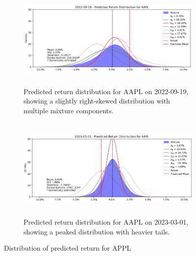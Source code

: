 \begin{figure}[H]
    \centering
    \begin{subfigure}[b]{0.49\textwidth}
        \centering
        \includegraphics[width=\linewidth, height=5cm]{Images/Results/APPL_distribution_example_1.png}
        \caption{Predicted return distribution for AAPL on 2022-09-19, showing a slightly right-skewed distribution with multiple mixture components.}
        \label{fig:APPL_distribution_example_1}
    \end{subfigure}
    \hfill
    \begin{subfigure}[b]{0.49\textwidth}
        \centering
        \includegraphics[width=\linewidth, height=5cm]{Images/Results/APPL_distribution_example_2.png}
        \caption{Predicted return distribution for AAPL on 2023-03-01, showing a peaked distribution with heavier tails.}
        \label{fig:APPL_distribution_example_2}
    \end{subfigure}
    \caption{Distribution of predicted return for APPL}
    \label{fig:descriptive_analysis_of_AAPL_daily_returns}
\end{figure}  

